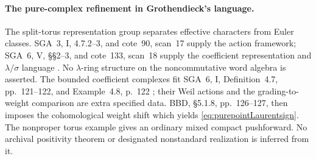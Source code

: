 \paragraph{The pure-complex refinement in Grothendieck's language.}
The split-torus representation group separates effective
characters from Euler classes. SGA~3, I, 4.7.2--3,
and cote~90, scan~17 supply the action framework;
SGA~6, V, \S\S2--3, and cote~133, scan~18 supply
the coefficient representation and \(\lambda/\sigma\)
language \cite{SGA3,SGA6,Archive}.
No \(\lambda\)-ring structure on the noncommutative word
algebra is asserted.
The bounded coefficient complexes fit SGA~6,
I, Definition~4.7, pp.~121--122, and Example~4.8,
p.~122 \cite{SGA6}; their Weil actions and the
grading-to-weight comparison are extra specified data.
BBD, \S5.1.8, pp.~126--127, then imposes the
cohomological weight shift which yields
\eqref{eq:purepointLaurentsign}.
The nonproper torus example gives an ordinary mixed
compact pushforward. No archival positivity theorem or
designated nonstandard realization is inferred from it.
